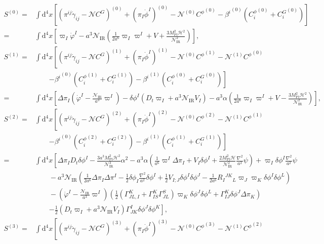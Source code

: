 \documentclass[aps, prd
, preprint
, nofootinbib 
, longbibliography
]{revtex4-1}
\newcommand{\dd}{\mathrm{d}}
\newcommand{\Mpl}{M_\mathrm{Pl}}
\newcommand{\IR}{\mathrm{IR}}
\newcommand{\calH}{\mathcal{H}}
\newcommand{\calN}{\mathcal{N}}
\newcommand{\dphi}{\delta\phi}
\newcommand{\Dpi}{\Delta\pi}
\newcommand{\bae}[1]{\begin{align} #1 \end{align}}
\begin{document}
\bae{
	S^{(0)} =& \int\dd^4x\left[(\pi^{ij}\dot{\gamma}_{ij}-\calN C^G)^{(0)}+(\pi_I\dot{\phi}^I)^{(0)}-\calN^{(0)}{C^\phi}^{(0)}
	-{\beta^i}^{(0)}({C_i^\phi}^{(0)}+{C_i^G}^{(0)})\right]
	\nonumber \\
	=&\int\dd^4x\left[\varpi_I\dot{\varphi}^I-a^3\calN_\IR\left(\frac{1}{2a^6}\varpi_I\varpi^I+V+\frac{3\Mpl^2\calH^2}{\calN_\IR^2}\right)\right], \\
	S^{(1)} =& \int\dd^4x\left[(\pi^{ij}\dot{\gamma}_{ij}-\calN C^G)^{(1)}+(\pi_I\dot{\phi}^I)^{(1)}-\calN^{(0)}{C^\phi}^{(1)}-\calN^{(1)}{C^\phi}^{(0)} \right. \nonumber \\
	&\qquad \left.-{\beta^i}^{(0)}({C_i^\phi}^{(1)}+{C_i^G}^{(1)})-{\beta^i}^{(1)}({C_i^\phi}^{(0)}+{C_i^G}^{(0)})\right] \nonumber \\
	=&\int\dd^4x\left[\Dpi_I\left(\dot{\varphi}^I-\frac{\calN_\IR}{a^3}\varpi^I\right)-\dphi^I\left(D_t\varpi_I+a^3\calN_\IR V_I\right)
	-a^3\alpha\left(\frac{1}{2a^6}\varpi_I\varpi^I+V-\frac{3\Mpl^2\calH^2}{\calN_\IR^2}\right)\right], \label{eq: S^(1) DD} \\
	S^{(2)}=&\int\dd^4x\left[(\pi^{ij}\dot{\gamma}_{ij}-\calN C^G)^{(2)}+(\pi_I\dot{\phi}^I)^{(2)}-\calN^{(0)}{C^\phi}^{(2)}-\calN^{(1)}{C^\phi}^{(1)} \right. \nonumber \\
	&\qquad \left. -{\beta^i}^{(0)}({C_i^\phi}^{(2)}+{C_i^G}^{(2)})-{\beta^i}^{(1)}({C_i^\phi}^{(1)}+{C_i^G}^{(1)})\right] \nonumber \\
	=&\int\dd^4x\left[\Dpi_ID_t\dphi^I-\frac{3a^3\Mpl^2\calH^2}{\calN_\IR^3}\alpha^2-a^3\alpha\left(\frac{1}{a^6}\varpi^I\Dpi_I+V_I\dphi^I
	+\frac{2\Mpl^2\calH}{\calN_\IR^2}\frac{\nabla^2}{a^2}\psi\right)+\varpi_I\dphi^I\frac{\nabla^2}{a^2}\psi \right. \nonumber \\
	&\qquad -a^3\calN_\IR\left(\frac{1}{2a^6}\Dpi_I\Dpi^I-\frac{1}{2}\dphi_I\frac{\nabla^2}{a^2}\dphi^I+\frac{1}{2}V_{I;J}\dphi^I\dphi^J
	-\frac{1}{2a^6}R_I{}^{JK}{}_L\varpi_J\varpi_K\dphi^I\dphi^L\right) \nonumber \\
	&\qquad -\left(\dot{\varphi}^I-\frac{\calN_\IR}{a^3}\varpi^I\right)\left(\frac{1}{2}(\Gamma^K_{JL,I}+\Gamma^K_{IS}\Gamma^S_{JL})\varpi_K\dphi^J\dphi^L
	+\Gamma_{IJ}^K\dphi^J\Dpi_K\right) \nonumber \\
	&\qquad \left.-\frac{1}{2}\left(D_t\varpi_I+a^3\calN_\IR V_I\right)\Gamma^I_{JK}\dphi^J\dphi^K\right], \label{eq: S^(2) DD} \\
	S^{(3)}=&\int\dd^4x\left[(\pi^{ij}\dot{\gamma}_{ij}-\calN C^G)^{(3)}+(\pi_I\dot{\phi}^I)^{(3)}-\calN^{(0)}{C^\phi}^{(3)}-\calN^{(1)}{C^\phi}^{(2)} \right. \nonumber \\
}
\end{document}
